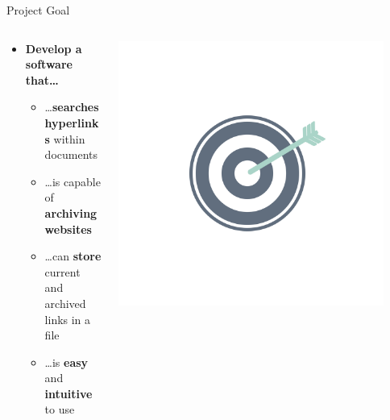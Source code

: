 \documentclass[
    ngerman,%
    authorontitle=true,
]{bfhbeamer}
\begin{document}
    \begin{frame}{Project Goal}
    	\begin{columns} %
    		\begin{column}{0.7\textwidth} %
    			\begin{itemize}
    				\item \textbf{Develop a software that\ldots}
    				\begin{itemize}
                        \item \ldots \textbf{searches hyperlinks} within documents
    				    \item \ldots is capable of \textbf{archiving websites}
    				    \item \ldots can \textbf{store} current and archived links in a file
    				    \item \ldots is \textbf{easy} and \textbf{intuitive} to use
                    \end{itemize}
                    
    			\end{itemize}
    		\end{column}
    		\begin{column}{0.3\textwidth} %
	    		\begin{center}
	    			\includegraphics[width=0.9\textwidth]{pictures/final_presentation/goal.jpg}
	    		\end{center}
    		\end{column}
    	\end{columns}
    \end{frame}
\end{document}
